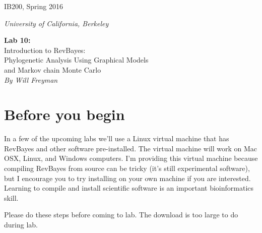 \documentclass[11pt]{article}
\begin{document}
\noindent
\large
\begin{minipage}{0.5\textwidth}
\begin{flushleft} 
IB200, Spring 2016
\end{flushleft}
\end{minipage}
\begin{minipage}{0.5\textwidth}
\begin{flushright} 
\textit{University of California, Berkeley}
\end{flushright}
\end{minipage}

\vspace{0.5cm}


\begin{center}
\Large \textbf{Lab 10:} \\
Introduction to RevBayes: \\
Phylogenetic Analysis Using Graphical Models \\
and Markov chain Monte Carlo \\
\normalsize
\textit{By Will Freyman}
\end{center}

\vspace{0.5cm}

\section{Before you begin}

In a few of the upcoming labs we'll use a Linux virtual machine that has
RevBayes and other software pre-installed.
The virtual machine will work on Mac OSX, Linux, and Windows computers.
I'm providing this virtual machine because compiling RevBayes from source
can be tricky (it's still experimental software), but I encourage you
to try installing on your own machine if you are interested.
Learning to compile and install scientific software is an
important bioinformatics skill.


Please do these steps before coming to lab.
The download is too large to do during lab.
\end{document}
